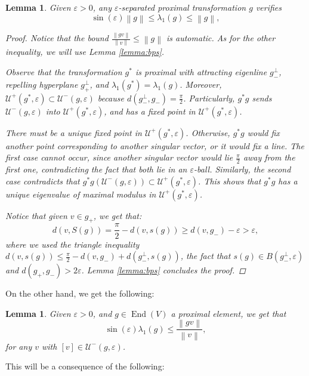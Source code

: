 \documentclass{amsart}
\DeclareMathOperator{\End}{End}
\newcommand{\norm}[1]{\left\lVert#1\right\rVert}
\newtheorem{lemma}[thm]{Lemma}
\theoremstyle{remark}
\theoremstyle{definition}
\begin{document}
\begin{lemma}
\label{lemma:proximalestimate}
 Given $\varepsilon >0$, any $\varepsilon$-separated proximal transformation $g$ verifies
 $$\sin (\varepsilon) \norm{g} \leq \lambda_1 (g) \leq \norm{g},$$
 \begin{proof}
 Notice that the bound $\frac{\norm{gv}}{\norm{v}} \leq \norm{g}$ is automatic.
 As for the other inequality, we will use Lemma \ref{lemma:bps}.

 Observe that the transformation $g^*$ is proximal with attracting eigenline $g_-^\perp$, repelling hyperplane $g_+^\perp$, and $\lambda_1 (g^*) = \lambda_1 (g)$.
 Moreover, $\mathcal{U}^+ (g^*, \varepsilon) \subset \mathcal{U}^- (g,\varepsilon)$ because $d (g_-^\perp, g_-) = \frac{\pi}{2}$.
 Particularly, $g^* g$ sends $\mathcal{U}^- (g,\varepsilon)$ into $\mathcal{U}^+ (g^*,\varepsilon)$, and has a fixed point in $\mathcal{U}^+ (g^*,\varepsilon)$.
 
 There must be a unique fixed point in $\mathcal{U}^+ (g^*,\varepsilon)$. Otherwise, $g^* g$ would fix another point corresponding to another singular vector, or it would fix a line. 
 The first case cannot occur, since another singular vector would lie $\frac{\pi}{2}$ away from the first one, contradicting the fact that both lie in an $\varepsilon$-ball. 
 Similarly, the second case contradicts that $g^*g (\mathcal{U}^- (g,\varepsilon)) \subset \mathcal{U}^+ (g^*,\varepsilon)$.
 This shows that $g^* g$ has a unique eigenvalue of maximal modulus in $\mathcal{U}^+ (g^*,\varepsilon)$.

 Notice that given $v \in g_+$, we get that:
        $$d (v, S(g)) = \frac{\pi}{2} - d(v,s(g)) \geq d(v, g_-) - \varepsilon > \varepsilon ,$$
 where we used the triangle inequality $d(v,s(g)) \leq \frac{\pi}{2} - d(v,g_-) + d (g_-^\perp, s(g))$, the fact that $s(g) \in B(g_-^\perp,\varepsilon)$ and $d(g_+,g_-) > 2\varepsilon$.
 Lemma \ref{lemma:bps} concludes the proof.
\end{proof}
\end{lemma}

On the other hand, we get the following:

\begin{lemma}
\label{lemma:agglomerated}
 Given $\varepsilon > 0$, and $g \in \End (V)$ a proximal element, we get that
 $$\sin (\varepsilon) \lambda_1 (g) \leq \frac{\norm{gv}}{\norm{v}},$$
 for any $v$ with $[v] \in \mathcal{U}^- (g,\varepsilon)$.
\end{lemma}

This will be a consequence of the following:
\end{document}
